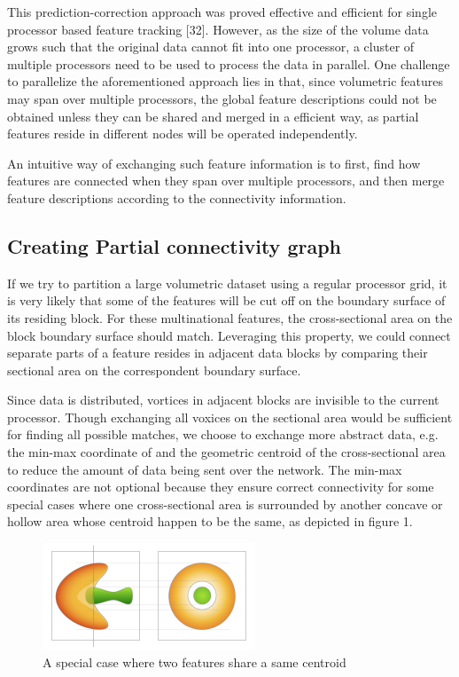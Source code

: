\documentclass[10pt, conference, compsocconf]{IEEEtran}
\begin{document}
This prediction-correction approach was proved effective and efficient for single processor based feature tracking [32]. However, as the size of the volume data grows such that the original data cannot fit into one processor, a cluster of multiple processors need to be used to process the data in parallel. One challenge to parallelize the aforementioned approach lies in that, since volumetric features may span over multiple processors, the global feature descriptions could not be obtained unless they can be shared and merged in a efficient way, as partial features reside in different nodes will be operated independently. 

An intuitive way of exchanging such feature information is to first, find how features are connected when they span over multiple processors, and then merge feature descriptions according to the connectivity information.

\subsection{Creating Partial connectivity graph}
If we try to partition a large volumetric dataset using a regular processor grid, it is very likely that some of the features will be cut off on the boundary surface of its residing block. For these multinational features, the cross-sectional area on the block boundary surface should match. Leveraging this property, we could connect separate parts of a feature resides in adjacent data blocks by comparing their sectional area on the correspondent boundary surface. 

Since data is distributed, vortices in adjacent blocks are invisible to the current processor. Though exchanging all voxices on the sectional area would be sufficient for finding all possible matches, we choose to exchange more abstract data, e.g. the min-max coordinate of and the geometric centroid of the cross-sectional area to reduce the amount of data being sent over the network. The min-max coordinates are not optional because they ensure correct connectivity for some special cases where one cross-sectional area is surrounded by another concave or hollow area whose centroid happen to be the same, as depicted in figure 1.

\begin{figure}[htpb]
\centering
\includegraphics[width=2.5in]{figure1@2x.png}
\caption{A special case where two features share a same centroid}
\label{fig_sim}
\end{figure}
\end{document}
